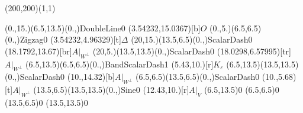 \unitlength=1bp%

\begin{feynartspicture}(200,200)(1,1)

\FADiagram{}
\FAProp(0.,15.)(6.5,13.5)(0.,){DoubleLine}{0}
\FALabel(3.54232,15.0367)[b]{$O$}
\FAProp(0.,5.)(6.5,6.5)(0.,){Zigzag}{0}
\FALabel(3.54232,4.96329)[t]{$\Delta$}
\FAProp(20,15.)(13.5,6.5)(0.,){ScalarDash}{0}
\FALabel(18.1792,13.67)[br]{$A|_{W^\perp}$}
\FAProp(20,5.)(13.5,13.5)(0.,){ScalarDash}{0}
\FALabel(18.0298,6.57995)[tr]{$A|_{W^\perp}$}
\FAProp(6.5,13.5)(6.5,6.5)(0.,){BandScalarDash}{1}
\FALabel(5.43,10.)[r]{$K_\varepsilon$}
\FAProp(6.5,13.5)(13.5,13.5)(0.,){ScalarDash}{0}
\FALabel(10.,14.32)[b]{$A|_{W^\perp}$}
\FAProp(6.5,6.5)(13.5,6.5)(0.,){ScalarDash}{0}
\FALabel(10.,5.68)[t]{$A|_{W^\perp}$}
\FAProp(13.5,6.5)(13.5,13.5)(0.,){Sine}{0}
\FALabel(12.43,10.)[r]{$A|_V$}
\FAVert(6.5,13.5){0}
\FAVert(6.5,6.5){0}
\FAVert(13.5,6.5){0}
\FAVert(13.5,13.5){0}
\end{feynartspicture}

